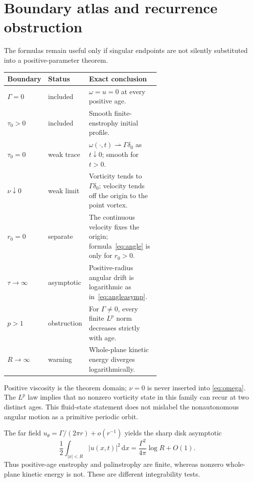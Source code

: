 \documentclass[10pt]{article}
\newcommand{\dd}{\,\mathrm d}
\begin{document}
\section{Boundary atlas and recurrence obstruction}
The formulas remain useful only if singular endpoints are not silently
substituted into a positive-parameter theorem.
\begin{center}
\small
\begin{tabular}{@{}llp{0.62\linewidth}@{}}
\toprule
Boundary & Status & Exact conclusion \\
\midrule
$\Gamma=0$ & included & $\omega=u=0$ at every positive age. \\
$\tau_0>0$ & included & Smooth finite-enstrophy initial profile. \\
$\tau_0=0$ & weak trace & $\omega(\cdot,t)\rightharpoonup\Gamma\delta_0$ as $t\downarrow0$; smooth for $t>0$. \\
$\nu\downarrow0$ & weak limit & Vorticity tends to $\Gamma\delta_0$; velocity tends off the origin to the point vortex. \\
$r_0=0$ & separate & The continuous velocity fixes the origin; formula~\eqref{eq:angle} is only for $r_0>0$. \\
$\tau\to\infty$ & asymptotic & Positive-radius angular drift is logarithmic as in~\eqref{eq:angleasymp}. \\
$p>1$ & obstruction & For $\Gamma\ne0$, every finite $L^p$ norm decreases strictly with age. \\
$R\to\infty$ & warning & Whole-plane kinetic energy diverges logarithmically. \\
\bottomrule
\end{tabular}
\end{center}
Positive viscosity is the theorem domain; $\nu=0$ is never inserted into
\eqref{eq:omega}.  The $L^p$ law implies that no nonzero vorticity state in
this family can recur at two distinct ages.  This fluid-state statement does
not mislabel the nonautonomous angular motion as a primitive periodic orbit.

The far field $u_\theta=\Gamma/(2\pi r)+o(r^{-1})$ yields the sharp disk
asymptotic
\begin{equation}\label{eq:energy}
 \frac12\int_{|x|<R}|u(x,t)|^2\dd x
 =\frac{\Gamma^2}{4\pi}\log R+O(1).
\end{equation}
Thus positive-age enstrophy and palinstrophy are finite, whereas nonzero
whole-plane kinetic energy is not.  These are different integrability tests.
\fi
\end{document}
